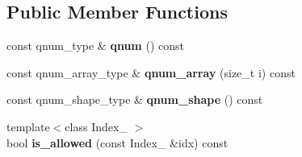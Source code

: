 \subsection*{Public Member Functions}
\begin{DoxyCompactItemize}
\item 
\hypertarget{classbtas_1_1_sp_shape_abc18a726996174cc4041c9f4284b8660}{
const qnum\_\-type \& {\bfseries qnum} () const }
\label{classbtas_1_1_sp_shape_abc18a726996174cc4041c9f4284b8660}

\item 
\hypertarget{classbtas_1_1_sp_shape_a415ea279d6361c5faae65bcb7b82fc49}{
const qnum\_\-array\_\-type \& {\bfseries qnum\_\-array} (size\_\-t i) const }
\label{classbtas_1_1_sp_shape_a415ea279d6361c5faae65bcb7b82fc49}

\item 
\hypertarget{classbtas_1_1_sp_shape_a1f4005fb32f36a559c62c932eab1467e}{
const qnum\_\-shape\_\-type \& {\bfseries qnum\_\-shape} () const }
\label{classbtas_1_1_sp_shape_a1f4005fb32f36a559c62c932eab1467e}

\item 
\hypertarget{classbtas_1_1_sp_shape_ad86af179e37cb056d519681bf95df3e1}{
{\footnotesize template$<$class Index\_\- $>$ }\\bool {\bfseries is\_\-allowed} (const Index\_\- \&idx) const }
\label{classbtas_1_1_sp_shape_ad86af179e37cb056d519681bf95df3e1}

\end{DoxyCompactItemize}
